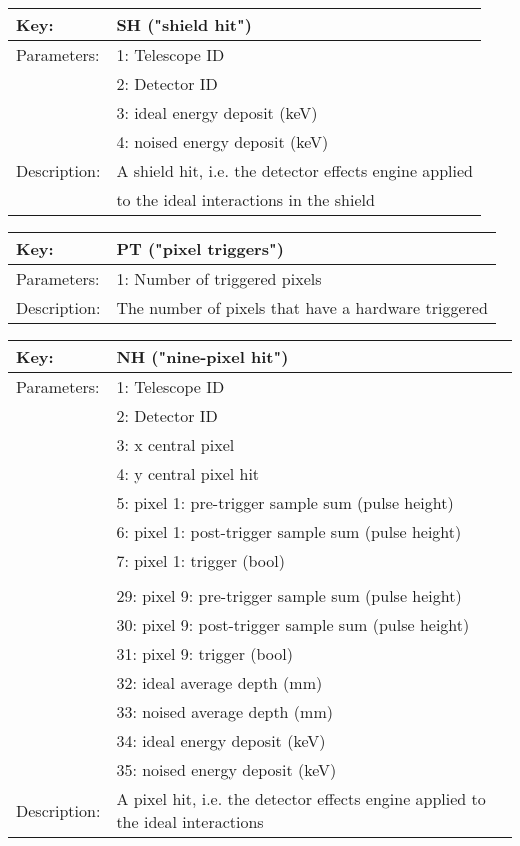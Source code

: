 \begin{table}[htdp]
\begin{center}
\begin{tabular}{|p{2cm}|p{12cm}|}
\hline
Key:& SH ("shield hit")\\
\hline
Parameters:&  1: Telescope ID\\
&2: Detector ID\\
&3: ideal energy deposit (keV)\\
&4: noised energy deposit (keV)\\
\hline
Description:& A shield hit, i.e. the detector effects engine applied \\
& to the ideal interactions in the shield\\
\hline
\end{tabular}
\end{center}
\end{table}

\begin{table}[htdp]
\begin{center}
\begin{tabular}{|p{2cm}|p{12cm}|}
\hline
Key:& PT ("pixel triggers")\\
\hline
Parameters:&  1: Number of triggered pixels\\
\hline
Description:& The number of pixels that have a hardware triggered\\
\hline
\end{tabular}
\end{center}
\end{table}

\begin{table}[htdp]
\begin{center}
\begin{tabular}{|p{2cm}|p{12cm}|}
\hline
Key:&	NH ("nine-pixel hit")\\
\hline
Parameters:&	1: Telescope ID\\
&2: Detector ID\\
&3: x central pixel\\
&4: y central pixel hit\\
&5: pixel 1: pre-trigger sample sum (pulse height)\\
&6: pixel 1: post-trigger sample sum (pulse height)\\
&7: pixel 1: trigger (bool)\\
&\\
&29: pixel 9: pre-trigger sample sum (pulse height)\\
&30: pixel 9: post-trigger sample sum (pulse height)\\
&31: pixel 9: trigger (bool)\\
&32: ideal average depth (mm)\\
&33: noised average depth (mm)\\
&34: ideal energy deposit (keV)\\
&35: noised energy deposit (keV)\\
\hline
Description:&	A pixel hit, i.e. the detector effects engine applied to the ideal interactions\\
\hline
\end{tabular}
\end{center}
\end{table}

